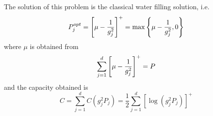 %
%
%
%
%
%

The solution of this problem is the classical water filling solution, i.e.
%
\begin{equation} \label{eq:3.13_Popt}
P_j^{opt} = \qty[ \mu - \frac{1}{g_j^2}]^+ = \max \qty{ \mu - \frac{1}{g_j^2},0}
\end{equation}
%
where $\mu$ is obtained from
%
\begin{equation} \label{eq:3.13_mu}
\sum_{j=1}^d \qty[\mu - \frac{1}{g_j^2}]^+ = P
\end{equation}
%
and the capacity obtained is
%
\begin{equation} \label{eq:3.13_capacity}
C = \sum_{j=1}^d C(g_j^2P_j) = \frac{1}{2}\sum_{j=1}^d [\log(g_j^2P_j)]^+
\end{equation}

